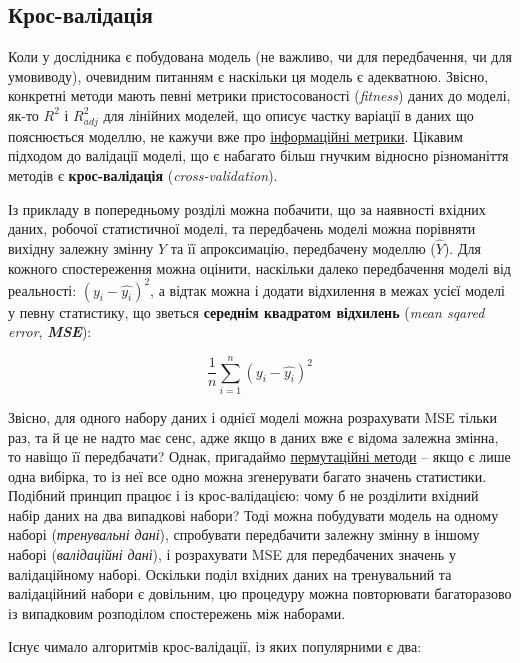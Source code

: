 \documentclass[
  11pt,
]{book}
\begin{document}
\subsection{Крос-валідація}\label{crossval}

Коли у дослідника є побудована модель (не важливо, чи для передбачення, чи для умовиводу), очевидним питанням є наскільки ця модель є адекватною. Звісно, конкретні методи мають певні метрики пристосованості (\emph{fitness}) даних до моделі, як-то \(R^2\) і \(R_{adj}^2\) для лінійних моделей, що описує частку варіації в даних що пояснюється моделлю, не кажучи вже про \hyperref[aic]{інформаційні метрики}. Цікавим підходом до валідації моделі, що є набагато більш гнучким відносно різноманіття методів є \textbf{крос-валідація} (\emph{cross-validation}).

Із прикладу в попередньому розділі можна побачити, що за наявності вхідних даних, робочої статистичної моделі, та передбачень моделі можна порівняти вихідну залежну змінну \(Y\) та її апроксимацію, передбачену моделлю (\(\hat{Y}\)). Для кожного спостереження можна оцінити, наскільки далеко передбачення моделі від реальності: \((y_i - \hat{y_i})^2\), а відтак можна і додати відхилення в межах усієї моделі у певну статистику, що зветься \textbf{середнім квадратом відхилень} (\emph{mean sqared error}, \textbf{\emph{MSE}}):

\[\frac{1}{n} \sum_{i = 1}^n ( y_i - \hat{y_i} )^2\]

Звісно, для одного набору даних і однієї моделі можна розрахувати MSE тільки раз, та й це не надто має сенс, адже якщо в даних вже є відома залежна змінна, то навіщо її передбачати? Однак, пригадаймо \hyperref[permutation-paradigm]{пермутаційні методи} -- якщо є лише одна вибірка, то із неї все одно можна згенерувати багато значень статистики. Подібний принцип працює і із крос-валідацією: чому б не розділити вхідний набір даних на два випадкові набори? Тоді можна побудувати модель на одному наборі (\emph{тренувальні дані}), спробувати передбачити залежну змінну в іншому наборі (\emph{валідаційні дані}), і розрахувати MSE для передбачених значень у валідаційному наборі. Оскільки поділ вхідних даних на тренувальний та валідаційний набори є довільним, цю процедуру можна повторювати багаторазово із випадковим розподілом спостережень між наборами.

Існує чимало алгоритмів крос-валідації, із яких популярними є два:
\end{document}
